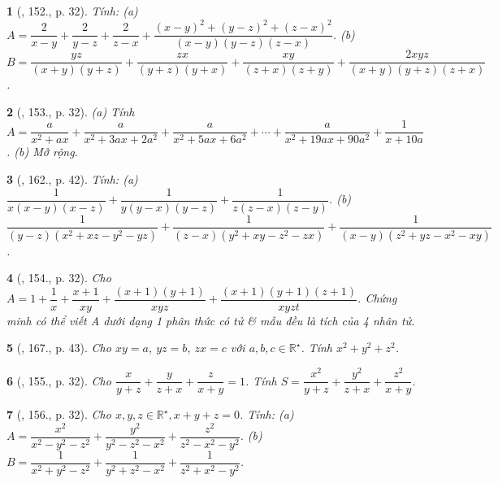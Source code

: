 \documentclass{article}
\newtheorem{baitoan}{}
\begin{document}
\begin{baitoan}[\cite{Tuyen_Toan_8}, 152., p. 32]
	Tính: (a) $A = \dfrac{2}{x - y} + \dfrac{2}{y - z} + \dfrac{2}{z - x} + \dfrac{(x - y)^2 + (y - z)^2 + (z - x)^2}{(x - y)(y - z)(z - x)}$. (b) $B = \dfrac{yz}{(x + y)(y + z)} + \dfrac{zx}{(y + z)(y + x)} + \dfrac{xy}{(z + x)(z + y)} + \dfrac{2xyz}{(x + y)(y + z)(z + x)}$.
\end{baitoan}

\begin{baitoan}[\cite{Tuyen_Toan_8}, 153., p. 32]
	(a) Tính $A = \dfrac{a}{x^2 + ax} + \dfrac{a}{x^2 + 3ax + 2a^2} + \dfrac{a}{x^2 + 5ax + 6a^2} + \cdots + \dfrac{a}{x^2 + 19ax + 90a^2} + \dfrac{1}{x + 10a}$. (b) Mở rộng.
\end{baitoan}

\begin{baitoan}[\cite{Tuyen_Toan_8_old}, 162., p. 42]
	Tính: (a) $\dfrac{1}{x(x - y)(x - z)} + \dfrac{1}{y(y - x)(y - z)} + \dfrac{1}{z(z - x)(z - y)}$. (b) $\dfrac{1}{(y - z)(x^2 + xz - y^2 - yz)} + \dfrac{1}{(z - x)(y^2 + xy - z^2 - zx)} + \dfrac{1}{(x - y)(z^2 + yz - x^2 - xy)}$.
\end{baitoan}

\begin{baitoan}[\cite{Tuyen_Toan_8}, 154., p. 32]
	Cho $A = 1 + \dfrac{1}{x} + \dfrac{x + 1}{xy} + \dfrac{(x + 1)(y + 1)}{xyz} + \dfrac{(x + 1)(y + 1)(z + 1)}{xyzt}$. Chứng minh có thể viết A dưới dạng 1 phân thức có tử \& mẫu đều là tích của 4 nhân tử.
\end{baitoan}

\begin{baitoan}[\cite{Tuyen_Toan_8_old}, 167., p. 43]
	Cho $xy = a$, $yz = b$, $zx = c$ với $a,b,c\in\mathbb{R}^\star$. Tính $x^2 + y^2 + z^2$.
\end{baitoan}

\begin{baitoan}[\cite{Tuyen_Toan_8}, 155., p. 32]
	Cho $\dfrac{x}{y + z} + \dfrac{y}{z + x} + \dfrac{z}{x + y} = 1$. Tính $S = \dfrac{x^2}{y + z} + \dfrac{y^2}{z + x} + \dfrac{z^2}{x + y}$.
\end{baitoan}

\begin{baitoan}[\cite{Tuyen_Toan_8}, 156., p. 32]
	Cho $x,y,z\in\mathbb{R}^\star,x + y + z = 0$. Tính: (a) $A = \dfrac{x^2}{x^2 - y^2 - z^2} + \dfrac{y^2}{y^2 - z^2 - x^2} + \dfrac{z^2}{z^2 - x^2 - y^2}$. (b) $B = \dfrac{1}{x^2 + y^2 - z^2} + \dfrac{1}{y^2 + z^2 - x^2} + \dfrac{1}{z^2 + x^2 - y^2}$.
\end{baitoan}
\end{document}
